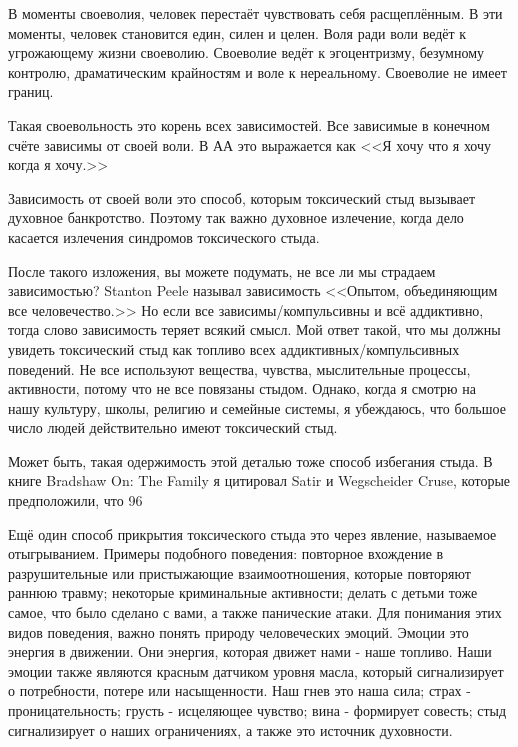 \documentclass[10pt, fleqn]{article}
\begin{document}
В моменты своеволия, человек перестаёт чувствовать себя расщеплённым. В эти моменты, человек становится един, силен и целен. Воля ради воли ведёт к угрожающему жизни своеволию. Своеволие ведёт к эгоцентризму, безумному контролю, драматическим крайностям и воле к нереальному. Своеволие не имеет границ.

Такая своевольность это корень всех зависимостей. Все зависимые в конечном счёте зависимы от своей воли. В АА это выражается как <<Я хочу что я хочу когда я хочу.>>

Зависимость от своей воли это способ, которым токсический стыд вызывает духовное банкротство. Поэтому так важно духовное излечение, когда дело касается излечения синдромов токсического стыда.

После такого изложения, вы можете подумать, не все ли мы страдаем зависимостью? Stanton Peele называл зависимость <<Опытом, объединяющим все человечество.>> Но если все зависимы/компульсивны и всё аддиктивно, тогда слово зависимость теряет всякий смысл. Мой ответ такой, что мы должны увидеть токсический стыд как топливо всех аддиктивных/компульсивных поведений. Не все используют вещества, чувства, мыслительные процессы, активности, потому что не все повязаны стыдом. Однако, когда я смотрю на нашу культуру, школы, религию и семейные системы, я убеждаюсь, что большое число людей действительно имеют токсический стыд.

Может быть, такая одержимость этой деталью тоже способ избегания стыда. В книге Bradshaw On: The Family я цитировал Satir и Wegscheider Cruse, которые предположили, что 96%


Ещё один способ прикрытия токсического стыда это через явление, называемое отыгрыванием. Примеры подобного поведения: повторное вхождение в разрушительные или пристыжающие взаимоотношения, которые повторяют раннюю травму; некоторые криминальные активности; делать с детьми тоже самое, что было сделано с вами, а также панические атаки.
Для понимания этих видов поведения, важно понять природу человеческих эмоций. Эмоции это энергия в движении. Они энергия, которая движет нами - наше топливо. Наши эмоции также являются красным датчиком уровня масла, который сигнализирует о потребности, потере или насыщенности. Наш гнев это наша сила; страх - проницательность; грусть - исцеляющее чувство; вина - формирует совесть; стыд сигнализирует о наших ограничениях, а также это источник духовности.
\end{document}
